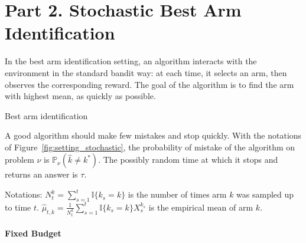 
\section*{Part 2. Stochastic Best Arm Identification}
\label{sec:best_arm_identification}

In the best arm identification setting, an algorithm interacts with the environment in the standard bandit way: at each time, it selects an arm, then observes the corresponding reward. The goal of the algorithm is to find the arm with highest mean, as quickly as possible.


\begin{setting}[ht!]
\begin{center}
\end{center}
\caption{Best arm identification}
\label{fig:setting_stochastic}
\end{setting}

A good algorithm should make few mistakes and stop quickly. With the notations of Figure~\ref{fig:setting_stochastic}, the probability of mistake of the algorithm on problem $\nu$ is $\mathbb{P}_\nu(\hat{k} \ne k^*)$. The possibly random time at which it stops and returns an answer is $\tau$.

Notations: $N_t^k = \sum_{s=1}^t \mathbb{I}\{k_s = k\}$ is the number of times arm $k$ was sampled up to time $t$. $\hat{\mu}_{t,k} = \frac{1}{N_t^k} \sum_{s=1}^t \mathbb{I}\{k_s = k\} X_s^{k_s}$ is the empirical mean of arm $k$.

\paragraph{Fixed Budget}
\label{par:fixed_budget}

